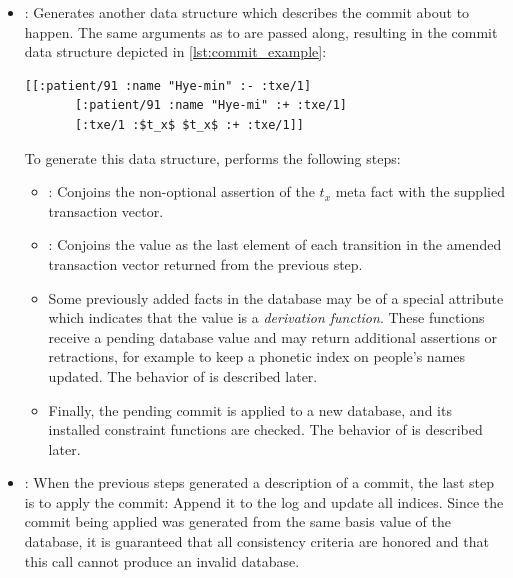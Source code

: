 \begin{itemize}
  \item {}: Generates another data structure which describes the commit about to happen. The same arguments as to  are passed along, resulting in the commit data structure depicted in \autoref{lst:commit_example}:

  \begin{lstlisting}[label={lst:commit_example},morekeywords={:txe/1},caption=A commit of one retraction and two assertions]
      [[:patient/91 :name "Hye-min" :- :txe/1]
       [:patient/91 :name "Hye-mi" :+ :txe/1]
       [:txe/1 :$t_x$ $t_x$ :+ :txe/1]]
  \end{lstlisting}

  To generate this data structure,  performs the following steps:
  \begin{itemize}
    \item {}: Conjoins the non-optional assertion of the $t_x$ meta fact with the supplied transaction vector.

    \item {}: Conjoins the  value as the last element of each transition in the amended transaction vector returned from the previous step.

    \item {} Some previously added facts in the database may be of a special attribute which indicates that the value is a \emph{derivation function}. These functions receive a pending database value and may return additional assertions or retractions, for example to keep a phonetic index on people's names updated. The behavior of  is described later.

    \item {} Finally, the pending commit is applied to a new database, and its installed constraint functions are checked. The behavior of  is described later.
  \end{itemize}

  \item {}: When the previous steps generated a description of a commit, the last step is to apply the commit: Append it to the log and update all indices. Since the commit being applied was generated from the same basis value of the database, it is guaranteed that all consistency criteria are honored and that this call cannot produce an invalid database.
\end{itemize}

